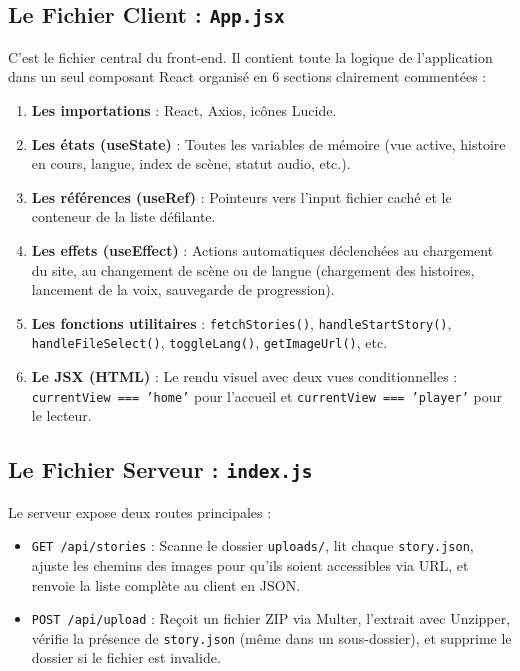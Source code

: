 \documentclass[12pt,twoside,letterpaper]{article}
\begin{document}
\subsection{Le Fichier Client : \texttt{App.jsx}}
C'est le fichier central du front-end. Il contient toute la logique de l'application dans un seul composant React organisé en 6 sections clairement commentées :
\begin{enumerate}
    \item \textbf{Les importations} : React, Axios, icônes Lucide.
    \item \textbf{Les états (useState)} : Toutes les variables de mémoire (vue active, histoire en cours, langue, index de scène, statut audio, etc.).
    \item \textbf{Les références (useRef)} : Pointeurs vers l'input fichier caché et le conteneur de la liste défilante.
    \item \textbf{Les effets (useEffect)} : Actions automatiques déclenchées au chargement du site, au changement de scène ou de langue (chargement des histoires, lancement de la voix, sauvegarde de progression).
    \item \textbf{Les fonctions utilitaires} : \texttt{fetchStories()}, \texttt{handleStartStory()}, \texttt{handleFileSelect()}, \texttt{toggleLang()}, \texttt{getImageUrl()}, etc.
    \item \textbf{Le JSX (HTML)} : Le rendu visuel avec deux vues conditionnelles : \texttt{currentView === 'home'} pour l'accueil et \texttt{currentView === 'player'} pour le lecteur.
\end{enumerate}

\subsection{Le Fichier Serveur : \texttt{index.js}}
Le serveur expose deux routes principales :
\begin{itemize}
    \item \texttt{GET /api/stories} : Scanne le dossier \texttt{uploads/}, lit chaque \texttt{story.json}, ajuste les chemins des images pour qu'ils soient accessibles via URL, et renvoie la liste complète au client en JSON.
    \item \texttt{POST /api/upload} : Reçoit un fichier ZIP via Multer, l'extrait avec Unzipper, vérifie la présence de \texttt{story.json} (même dans un sous-dossier), et supprime le dossier si le fichier est invalide.
\end{itemize}
\end{document}

